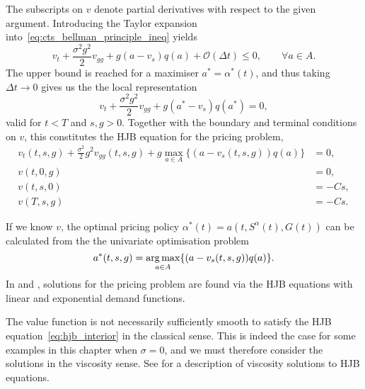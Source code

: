 \documentclass[main.tex]{subfiles}
\begin{document}
The subscripts on $v$ denote partial derivatives with respect to the
given argument.
Introducing the Taylor expansion into~\eqref{eq:cts_bellman_principle_ineq}
yields
\begin{equation}
  v_t
  +{\textstyle\frac{\sigma^2g^2}{2}}
  v_{gg}+
  g(a-v_s)q(a)
  +\mathcal{O}(\Delta{t})\leq 0,\qquad \forall a\in A.
\end{equation}
The upper bound is reached for a maximiser $a^*=\alpha^*(t)$, and thus
taking $\Delta{t}\to 0$ gives us the the local representation
\begin{equation}
  v_t+\frac{\sigma^2g^2}{2}v_{gg}
  + g(a^*-v_s)q(a^*) = 0,
\end{equation}
valid for $t<T$ and $s,g>0$.
Together with the boundary and terminal conditions on
$v$, this constitutes the HJB equation for the pricing problem,
\begin{align}\label{eq:hjb_interior}
  v_t(t,s,g)+\frac{\sigma^2}{2} g^2v_{gg}(t,s,g)
  +g\max_{a\in A}\{(a-v_s(t,s,g))q(a)\} &= 0,\\ %
  v(t,0,g) &= 0,\\
  v(t,s,0) &= -Cs,\\
  v(T,s,g) &= -Cs.
\end{align}

If we know $v$, the optimal pricing policy
$\alpha^*(t)=a(t,S^{\alpha}(t),G(t))$
can be calculated
from the
the univariate optimisation problem
\begin{equation}\label{eq:pricing_function_general}
  a^*(t,s,g) = \operatorname*{arg\,max}_{a\in A}\{(a-v_s(t,s,g))q(a)\}.
\end{equation}
In  and , solutions for the
pricing problem are found via the HJB equations with linear and
exponential demand functions.
\begin{remark}\label{rem:viscosity}
  The value function is not necessarily sufficiently smooth to satisfy
  the HJB equation~\eqref{eq:hjb_interior} in the classical sense.
  This is indeed the case for some examples in this chapter when $\sigma=0$,
  and we must therefore consider
  the solutions in the viscosity sense. See \citet{pham2009continuous}
  for a description of viscosity solutions to HJB equations.
\end{remark}
\end{document}
